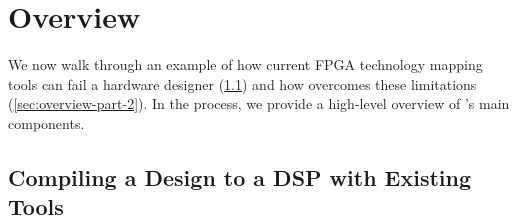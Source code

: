 \section{Overview}
\label{sec:overview}
% 

We now walk through an 
  example
  of how current FPGA technology mapping tools can fail
  a hardware designer (\cref{sec:overview-part-1}) 
  and how \lr overcomes these limitations (\cref{sec:overview-part-2}).
In the process,
  we provide a high-level overview
  of \lr's main components.

\subsection{Compiling a Design to a DSP with Existing Tools}
\label{sec:overview-part-1}

